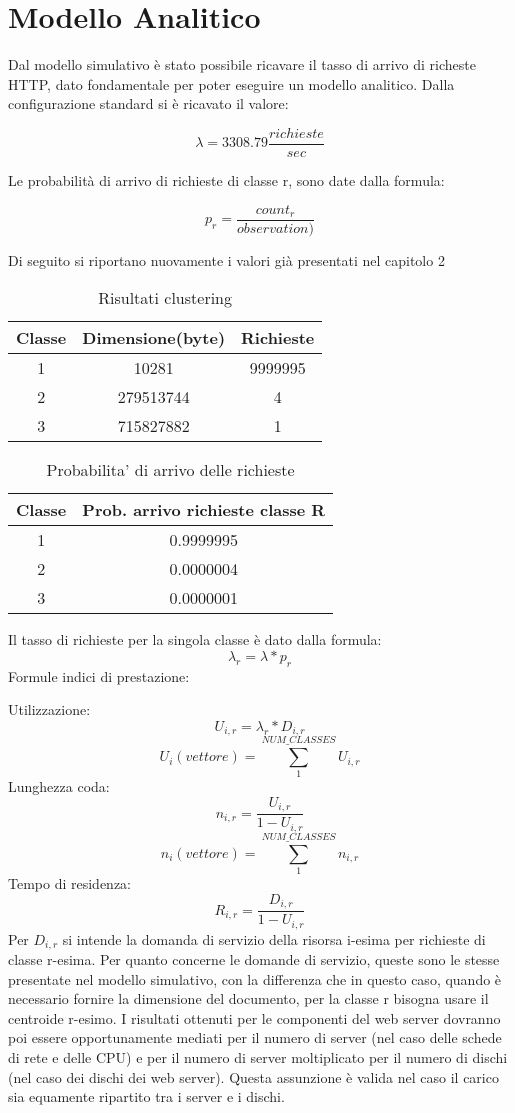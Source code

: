 \chapter{Modello Analitico}
Dal modello simulativo è stato possibile ricavare il tasso di arrivo di richeste HTTP, dato fondamentale per poter eseguire un modello analitico. Dalla configurazione standard si è ricavato il valore: 

$$\lambda =  3308.79 \frac{richieste}{sec}$$

Le probabilità di arrivo di richieste di classe r, sono date dalla formula:

$$p_{r} = \frac{count_{r}}{observation)}$$

Di seguito si riportano nuovamente i valori già presentati nel capitolo 2
\begin{table}[H]
\begin{center}
\begin{tabular}{||c|c|c||}
\hline
Classe	&Dimensione(byte)		&Richieste \\ 
\hline\hline
1 &10281 &9999995\\ \hline
2 &279513744 &4 \\ \hline
3 &715827882 &1 \\ \hline
\end{tabular}
\end{center}
\caption{Risultati clustering}
\label{risclustering}
\end{table}
\begin{table}[H]
\begin{center}
\begin{tabular}{||c|c||}
\hline
Classe		&Prob. arrivo richieste classe R	\\
\hline
\hline
1		&0.9999995	\\
\hline
2		&0.0000004\\
\hline
3		&0.0000001\\
\hline
\end{tabular}
\end{center}
\caption{Probabilita' di arrivo delle richieste}
\label{test_2}
\end{table}
Il tasso di richieste per la singola classe è dato dalla formula: 
$$
\lambda_{r} = \lambda*p_{r}
$$
Formule indici di prestazione:

Utilizzazione:
$$U_{i,r} = \lambda_{r} * D_{i,r}$$
$$U_{i} (vettore)  = \sum_{1}^{NUM\_CLASSES} U_{i,r}$$
Lunghezza coda:
$$n_{i,r} = \frac{U_{i,r}}{1 - U_{i,r}}$$
$$n_{i} (vettore) = \sum_{1}^{NUM\_CLASSES} n_{i,r}$$
Tempo di residenza:
$$R_{i,r} = \frac{D_{i,r}}{1 - U_{i,r}}$$
Per $D_{i,r}$ si intende la domanda di servizio della risorsa i-esima per richieste di classe r-esima. Per quanto concerne le domande di servizio, queste sono le stesse presentate nel modello simulativo, con la differenza che in questo caso, quando è necessario fornire la dimensione del documento, per la classe r bisogna usare il centroide r-esimo. I risultati ottenuti per le componenti del web server dovranno poi essere opportunamente mediati per il numero di server (nel caso delle schede di rete e delle CPU) e per il numero di server moltiplicato per il numero di dischi (nel caso dei dischi dei web server). Questa assunzione è valida nel caso il carico sia equamente ripartito tra i server e i dischi.
